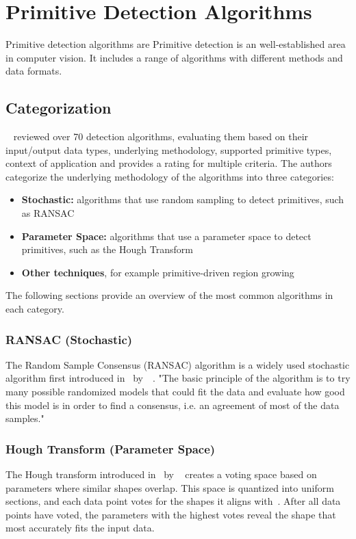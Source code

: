 \chapter{Primitive Detection Algorithms}
Primitive detection algorithms are
Primitive detection is an well-established area in computer vision.
It includes a range of algorithms with different methods and data formats.


\section{Categorization}
\citeauthor{kaiser_survey_2019}~\cite{kaiser_survey_2019} reviewed over 70 detection algorithms, evaluating them based on their input/output data types,
underlying methodology, supported primitive types, context of application and provides a rating for multiple criteria.
The authors categorize the underlying methodology of the algorithms into three categories:
\begin{itemize}
    \item \textbf{Stochastic:} algorithms that use random sampling to detect primitives, such as RANSAC
    \item \textbf{Parameter Space:} algorithms that use a parameter space to detect primitives, such as the Hough Transform
    \item \textbf{Other techniques}, for example primitive-driven region growing
\end{itemize}

The following sections provide an overview of the most common algorithms in each category.

\subsection{RANSAC (Stochastic)}
The Random Sample Consensus (RANSAC) algorithm is a widely used stochastic algorithm first introduced in~\citeyear{fischler_random_1981} by~\citeauthor{fischler_random_1981}~\cite{fischler_random_1981}.
"The basic principle of the algorithm is to try many possible randomized models that could fit
the data and evaluate how good this model is in order to find a consensus, i.e. an agreement of most of the data samples."~\parencite{kaiser_survey_2019}

\subsection{Hough Transform (Parameter Space)}
The Hough transform introduced in~\citeyear{hough_method_1962} by \citeauthor{hough_method_1962}~\parencite{hough_method_1962} creates a voting space based on parameters where similar shapes overlap.
This space is quantized into uniform sections, and each data point votes for the shapes it aligns with~\parencite{duda_use_1972}.
After all data points have voted, the parameters with the highest votes reveal the shape that most accurately fits the input data.

